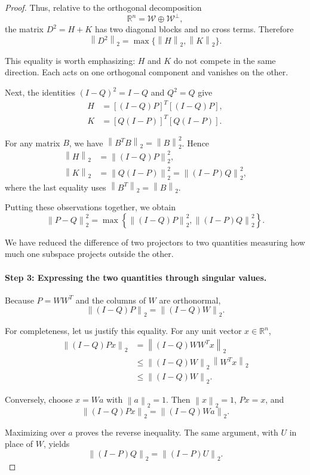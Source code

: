 \documentclass[14pt,letterpaper]{article}
\theoremstyle{plain}
\theoremstyle{definition}
\theoremstyle{remark}
\newcommand{\R}{\mathbb{R}}
\newcommand{\norm}[1]{\left\lVert #1 \right\rVert}
\begin{document}
\begin{proof}
Thus, relative to the orthogonal decomposition
\[
\R^n=\mathcal W\oplus\mathcal W^\perp,
\]
the matrix $D^2=H+K$ has two diagonal blocks and no
cross terms. Therefore
\[
\boxed{
\norm{D^2}_2=\max\{\norm{H}_2,\norm{K}_2\}.
}
\]

This equality is worth emphasizing: $H$ and $K$ do not
compete in the same direction. Each acts on one
orthogonal component and vanishes on the other.

Next, the identities $(I-Q)^2=I-Q$ and $Q^2=Q$ give
\[
\begin{aligned}
H&=[(I-Q)P]^T[(I-Q)P],\\
K&=[Q(I-P)]^T[Q(I-P)].
\end{aligned}
\]

For any matrix $B$, we have
$\norm{B^TB}_2=\norm{B}_2^2$. Hence
\[
\begin{aligned}
\norm{H}_2&=\norm{(I-Q)P}_2^2,\\
\norm{K}_2&=\norm{Q(I-P)}_2^2
              =\norm{(I-P)Q}_2^2,
\end{aligned}
\]
where the last equality uses
$\norm{B^T}_2=\norm{B}_2$.

Putting these observations together, we obtain
\[
\boxed{
\norm{P-Q}_2^2
=\max\!\left\{
\norm{(I-Q)P}_2^2,
\norm{(I-P)Q}_2^2
\right\}.
}
\]

We have reduced the difference of two projectors to
two quantities measuring how much one subspace
projects outside the other.

\paragraph{Step 3: Expressing the two quantities through singular values.}

Because $P=WW^T$ and the columns of $W$ are
orthonormal,
\[
\boxed{
\norm{(I-Q)P}_2=\norm{(I-Q)W}_2.
}
\]

For completeness, let us justify this equality. For
any unit vector $x\in\R^n$,
\[
\begin{aligned}
\norm{(I-Q)Px}_2
&=\norm{(I-Q)WW^Tx}_2\\
&\leq\norm{(I-Q)W}_2\,\norm{W^Tx}_2\\
&\leq\norm{(I-Q)W}_2.
\end{aligned}
\]

Conversely, choose $x=Wa$ with $\norm{a}_2=1$.
Then $\norm{x}_2=1$, $Px=x$, and
\[
\norm{(I-Q)Px}_2=\norm{(I-Q)Wa}_2.
\]

Maximizing over $a$ proves the reverse inequality.
The same argument, with $U$ in place of $W$, yields
\[
\boxed{
\norm{(I-P)Q}_2=\norm{(I-P)U}_2.
}
\]


\end{proof}
\end{document}
